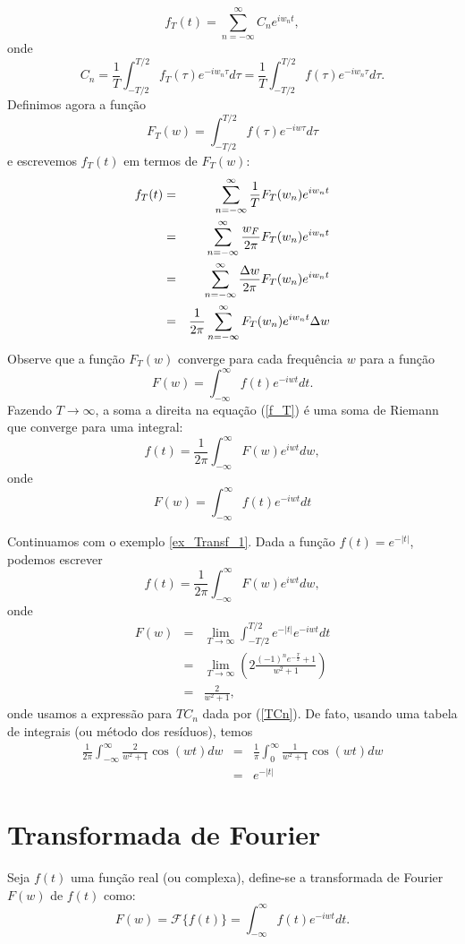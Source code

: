 $$
f_T(t)=\sum_{n=-\infty}^\infty C_n e^{i w_n t},
$$
onde 
$$C_n=\frac{1}{T}\int_{-T/2}^{T/2}f_T(\tau)e^{-iw_n \tau}d\tau=\frac{1}{T}\int_{-T/2}^{T/2}f(\tau)e^{-iw_n \tau}d\tau.$$
Definimos agora a função $$F_T(w)=\int_{-T/2}^{T/2}f(\tau)e^{-iw \tau}d\tau$$ e escrevemos $f_T(t)$ em termos de $F_T(w)$:
\begin{eqnarray}
\nonumber f_T(t)&=&\sum_{n=-\infty}^\infty \frac{1}{T}F_T(w_n) e^{i w_n t}\\&=& \sum_{n=-\infty}^\infty \frac{w_F}{2\pi}F_T(w_n) e^{i w_n t}
\\\nonumber &=& \sum_{n=-\infty}^\infty \frac{\Delta w}{2\pi}F_T(w_n) e^{i w_n t}
\\{\label{f_T}}&=&\frac{1}{2\pi} \sum_{n=-\infty}^\infty F_T(w_n) e^{i w_n t}\Delta w
\end{eqnarray}
Observe que a função $F_T(w)$ converge para cada frequência $w$ para a função 
$$
F(w)=\int_{-\infty}^\infty f(t) e^{-iw t}dt.
$$
Fazendo $T\to \infty$, a soma a direita na equação (\ref{f_T}) é uma soma de Riemann que converge para uma integral:
$$
f(t)=\frac{1}{2\pi} \int_{-\infty}^\infty F(w)e^{iw t}dw,
$$
onde
$$F(w)=\int_{-\infty}^{\infty}f(t)e^{-i w t}dt$$

\begin{ex} Continuamos com o exemplo \ref{ex_Transf_1}. Dada a função $f(t)=e^{-|t|}$, podemos escrever
$$
f(t)=\frac{1}{2\pi} \int_{-\infty}^\infty F(w)e^{iw t}dw,
$$
onde
\begin{eqnarray*}
F(w)&=&\lim_{T\to\infty}\int_{-T/2}^{T/2}e^{-|t|} e^{-i w t}dt\\
&=&\lim_{T\to\infty}\left(2\frac{ (-1)^ne^{-\frac{T}{2}}+1}{w^2+1} \right)\\
&=&\frac{2}{w^2+1},
\end{eqnarray*}
onde usamos a expressão para $TC_n$ dada por (\ref{TCn}). De fato, usando uma tabela de integrais (ou método dos resíduos), temos
\begin{eqnarray}
\frac{1}{2\pi} \int_{-\infty}^\infty \frac{2}{w^2+1} \cos(wt)dw
&=&\frac{1}{\pi} \int_{0}^\infty \frac{1}{w^2+1} \cos(wt)dw\\
&=&e^{-|t|}
\end{eqnarray}
\end{ex}

\section{Transformada de Fourier}

\begin{defn}Seja $f(t)$ uma função real (ou complexa), define-se a transformada de Fourier $F(w)$ de $f(t)$ como:
$$
F(w)=\mathcal{F}\{f(t)\}=\int_{-\infty}^\infty f(t)e^{-iwt}dt.
$$
\end{defn}


